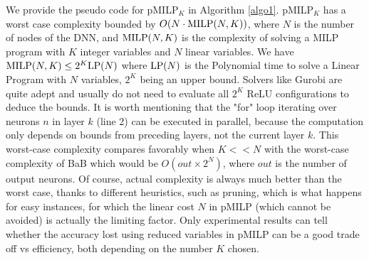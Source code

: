 
We provide the pseudo code for pMILP$_K$ in Algorithm \ref{algo1}.
pMILP$_K$ has a worst case complexity bounded by $O(N \cdot {\textrm{MILP}}(N,K))$, 
where $N$ is the number of nodes of the DNN, and ${\textrm{MILP}}(N,K)$ is the complexity of solving a MILP program with $K$ integer variables and $N$ linear variables.
We have ${\textrm{MILP}}(N,K) \leq 2^K {\textrm{LP}}(N)$ where ${\textrm{LP}}(N)$ is the Polynomial time to solve a Linear Program with $N$ variables, $2^K$ being an upper bound. Solvers like Gurobi are quite adept and usually do not need to evaluate all $2^K$ ReLU configurations to deduce the bounds.
It is worth mentioning that the "for" loop iterating over neurons $n$ in layer $k$ (line 2) can be executed in parallel, because the computation only depends on bounds from preceding layers, not the current layer $k$. This worst-case complexity compares favorably when $K<<N$ with the worst-case complexity of BaB which would be $O(out \times 2^N)$, where $out$ is the number of output neurons. Of course, actual complexity is always much better than the worst case, thanks to different heuristics, such as pruning, which is what happens for easy instances, for which the linear cost $N$ in pMILP (which cannot be avoided) is actually the limiting factor. Only experimental results can tell whether the accuracy lost using reduced variables in pMILP can be a good trade off vs efficiency, both depending on the number $K$ chosen.


